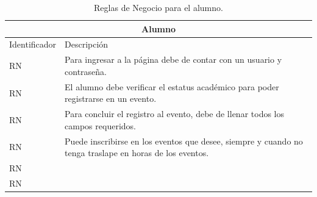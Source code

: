\begin{table}[hbt!]
	\begin{center}
		\begin{tabular}{|p{30mm}|p{100mm}|}
			\hline
			\multicolumn{2}{|c|}{Alumno} \\ \hline
			Identificador & Descripción \\ \hline 
			RN & Para ingresar a la página debe de contar con un usuario y contraseña.\\ \hline
			RN & El alumno debe verificar el estatus académico para poder registrarse en un evento.\\ \hline
			RN & Para concluir el registro al evento, debe de llenar todos los campos requeridos.\\ \hline
			RN & Puede inscribirse en los eventos que desee, siempre y cuando no tenga traslape en horas de los eventos.\\ \hline
			RN & \\ \hline
			RN & \\ \hline
		\end{tabular}
		\caption{Reglas de Negocio para el alumno.}
		\label{RNA}
	\end{center}
\end{table}
\pagebreak

